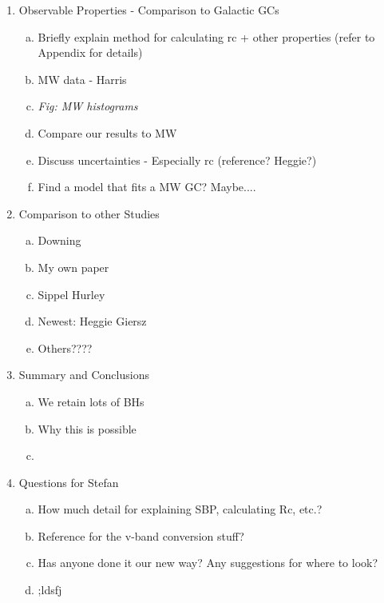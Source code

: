 \documentclass[12pt,preprint]{aastex}
\begin{document}
\begin{enumerate}[1.]
	\item Observable Properties - Comparison to Galactic GCs
	\begin{enumerate}[a.]
		\item Briefly explain method for calculating rc + other properties (refer to Appendix for details)
		\item MW data - Harris
		\item \emph{Fig: MW histograms}
		\item Compare our results to MW
		\item Discuss uncertainties - Especially rc (reference? Heggie?)
		\item Find a model that fits a MW GC? Maybe....
	\end{enumerate}
	
	\item Comparison to other Studies
	\begin{enumerate}[a.]
		\item Downing
		\item My own paper
		\item Sippel Hurley
		\item Newest: Heggie Giersz
		\item Others????
	\end{enumerate}
		
	\item Summary and Conclusions
	\begin{enumerate}[a.]
		\item We retain lots of BHs
		\item Why this is possible
		\item 
	\end{enumerate}
	
	\item Questions for Stefan
	\begin{enumerate}[a.]
		\item How much detail for explaining SBP, calculating Rc, etc.?
		\item Reference for the v-band conversion stuff?
		\item Has anyone done it our new way? Any suggestions for where to look?
		\item ;ldsfj
	\end{enumerate}

\end{enumerate}
\clearpage


\end{document}
